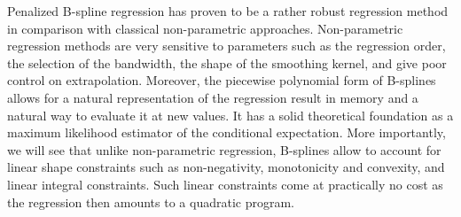 \documentclass[a4paper]{article}
\newcommand{\1}{\textbf{1}}
\begin{document}
\par Penalized B-spline regression has proven to be a rather robust regression method in comparison with classical non-parametric approaches. Non-parametric regression methods are very sensitive to parameters such as the regression order, the selection of the bandwidth, the shape of the smoothing kernel, and give poor control on extrapolation. Moreover, the piecewise polynomial form of B-splines allows for a natural representation of the regression result in memory and a natural way to evaluate it at new values. It has a solid theoretical foundation as a maximum likelihood estimator of the conditional expectation. More importantly, we will see that unlike non-parametric regression, B-splines allow to account for linear shape constraints such as non-negativity, monotonicity and convexity, and linear integral constraints. Such linear constraints come at practically no cost as the regression then amounts to a quadratic program. 
\end{document}
